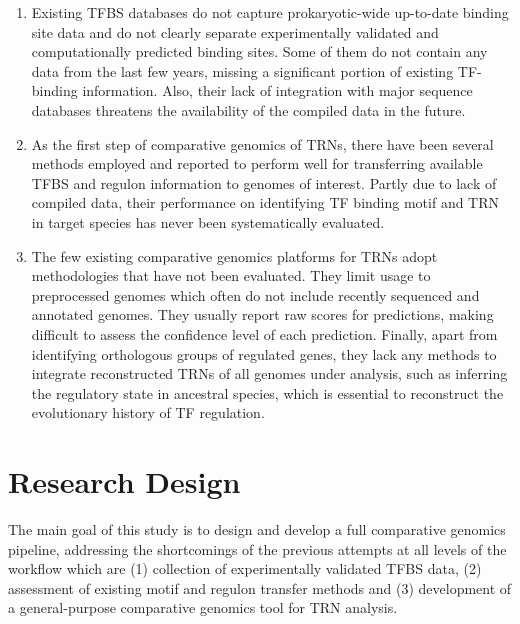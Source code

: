\begin{enumerate}
\item Existing TFBS databases do not capture prokaryotic-wide up-to-date
  binding site data and do not clearly separate experimentally validated and
  computationally predicted binding sites. Some of them do not contain any data
  from the last few years, missing a significant portion of existing TF-binding
  information. Also, their lack of integration with major sequence databases
  threatens the availability of the compiled data in the future.

\item As the first step of comparative genomics of TRNs, there have been
  several methods employed and reported to perform well for transferring
  available TFBS and regulon information to genomes of interest. Partly due to
  lack of compiled data, their performance on identifying TF binding motif and
  TRN in target species has never been systematically evaluated.

\item The few existing comparative genomics platforms for TRNs adopt
  methodologies that have not been evaluated. They limit usage to preprocessed
  genomes which often do not include recently sequenced and annotated
  genomes. They usually report raw scores for predictions, making difficult to
  assess the confidence level of each prediction.  Finally, apart from
  identifying orthologous groups of regulated genes, they lack any methods to
  integrate reconstructed TRNs of all genomes under analysis, such as inferring
  the regulatory state in ancestral species, which is essential to reconstruct
  the evolutionary history of TF regulation.
\end{enumerate}

\section{Research Design}

The main goal of this study is to design and develop a full comparative
genomics pipeline, addressing the shortcomings of the previous attempts at all
levels of the workflow which are (1) collection of experimentally validated
TFBS data, (2) assessment of existing motif and regulon transfer methods and
(3) development of a general-purpose comparative genomics tool for TRN
analysis.

